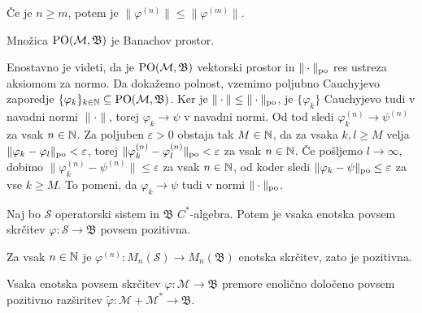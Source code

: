 \begin{opomba}
    Če je $n \geq m$, potem je $\| \varphi^{(n)} \| \leq \| \varphi^{(m)}\|$.
\end{opomba}
 
\begin{trditev}
    Množica $\operatorname{PO} (\mathcal{M}, \mathfrak{B})$ je Banachov prostor.
\end{trditev}

\begin{dokaz}
    Enostavno je videti, da je $\operatorname{PO} (\mathcal{M}, \mathfrak{B})$ vektorski prostor in $\| \cdot \|_{\operatorname{po}}$ res ustreza aksiomom za normo.
    Da dokažemo polnost, vzemimo poljubno Cauchyjevo zaporedje $\{\varphi_k\}_{k \in \mathbb N} \subseteq \operatorname{PO} (\mathcal{M}, \mathfrak{B})$.
    Ker je $\| \cdot \| \leq \| \cdot\|_{\operatorname{po}}$, je $\{\varphi_k\}$ Cauchyjevo tudi v navadni normi $\| \cdot\|$, torej $\varphi_k \to \psi$
    v navadni normi. Od tod sledi $\varphi_k ^{(n)} \to \psi^{(n)}$ za vsak $n \in \mathbb N$.
    Za poljuben $\varepsilon > 0$ obstaja tak $M \in \mathbb N$, da za vsaka $k, l \geq M$
    velja $\| \varphi_k - \varphi_l\|_{\operatorname{po}} < \varepsilon$, torej $\| \varphi_k ^{(n)} - \varphi_l ^{(n)}\|_{\operatorname{po}} < \varepsilon$ za vsak $n \in \mathbb N$.
    Če pošljemo $l \to \infty$, dobimo $\| \varphi_k ^{(n)} - \psi^{(n)} \| \leq \varepsilon$ za vsak $n \in \mathbb N$, od koder sledi 
    $\| \varphi_k - \psi\|_{\operatorname{po}} \leq \varepsilon$ za vse $k \geq M$.
    To pomeni, da $\varphi_k \to \psi$ tudi v normi $\| \cdot \|_{\operatorname{po}}$.    
\end{dokaz}

\begin{trditev}
    Naj bo $\mathcal{S}$ operatorski sistem in $\mathfrak{B}$ $C^*$-algebra.
    Potem je vsaka enotska povsem skrčitev $\varphi: \mathcal{S} \to \mathfrak{B}$ povsem pozitivna.
\end{trditev}

\begin{dokaz}
    Za vsak $n \in \mathbb N$ je $\varphi^{(n)}: M_n (\mathcal{S}) \to M_n (\mathfrak{B})$ enotska skrčitev,
    zato je pozitivna.
\end{dokaz}

\begin{posledica}\label{pos:1.2}
    Vsaka enotska povsem skrčitev $\varphi: \mathcal{M} \to \mathfrak{B}$ premore enolično določeno povsem pozitivno razširitev 
    $\tilde{\varphi}: \mathcal{M} + \mathcal{M}^* \to \mathfrak{B}$.
\end{posledica}

